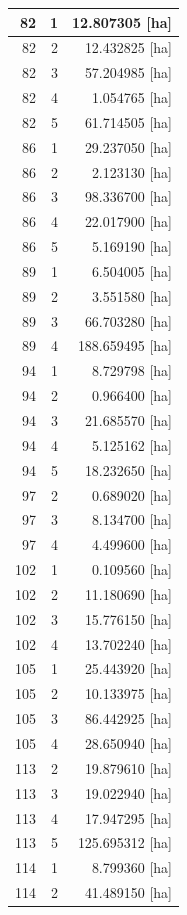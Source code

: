 \documentclass[11pt,]{book}
\begin{document}
\begin{table}
\begin{tabular}[t]{r|r|r}
\hline
82 & 1 & 12.807305 [ha]\\
\hline
82 & 2 & 12.432825 [ha]\\
\hline
82 & 3 & 57.204985 [ha]\\
\hline
82 & 4 & 1.054765 [ha]\\
\hline
82 & 5 & 61.714505 [ha]\\
\hline
86 & 1 & 29.237050 [ha]\\
\hline
86 & 2 & 2.123130 [ha]\\
\hline
86 & 3 & 98.336700 [ha]\\
\hline
86 & 4 & 22.017900 [ha]\\
\hline
86 & 5 & 5.169190 [ha]\\
\hline
89 & 1 & 6.504005 [ha]\\
\hline
89 & 2 & 3.551580 [ha]\\
\hline
89 & 3 & 66.703280 [ha]\\
\hline
89 & 4 & 188.659495 [ha]\\
\hline
94 & 1 & 8.729798 [ha]\\
\hline
94 & 2 & 0.966400 [ha]\\
\hline
94 & 3 & 21.685570 [ha]\\
\hline
94 & 4 & 5.125162 [ha]\\
\hline
94 & 5 & 18.232650 [ha]\\
\hline
97 & 2 & 0.689020 [ha]\\
\hline
97 & 3 & 8.134700 [ha]\\
\hline
97 & 4 & 4.499600 [ha]\\
\hline
102 & 1 & 0.109560 [ha]\\
\hline
102 & 2 & 11.180690 [ha]\\
\hline
102 & 3 & 15.776150 [ha]\\
\hline
102 & 4 & 13.702240 [ha]\\
\hline
105 & 1 & 25.443920 [ha]\\
\hline
105 & 2 & 10.133975 [ha]\\
\hline
105 & 3 & 86.442925 [ha]\\
\hline
105 & 4 & 28.650940 [ha]\\
\hline
113 & 2 & 19.879610 [ha]\\
\hline
113 & 3 & 19.022940 [ha]\\
\hline
113 & 4 & 17.947295 [ha]\\
\hline
113 & 5 & 125.695312 [ha]\\
\hline
114 & 1 & 8.799360 [ha]\\
\hline
114 & 2 & 41.489150 [ha]\\

\end{tabular}
\end{table}
\end{document}
